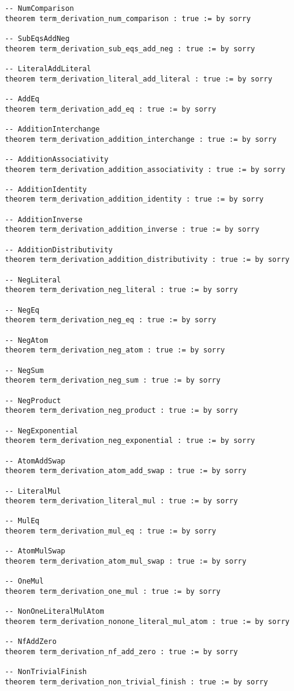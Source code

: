 \documentclass{article}
\begin{document}
\begin{tcolorbox}[colback=white!10, width=\linewidth]
\begin{lstlisting}[language=Lean4]
-- NumComparison
theorem term_derivation_num_comparison : true := by sorry

-- SubEqsAddNeg
theorem term_derivation_sub_eqs_add_neg : true := by sorry

-- LiteralAddLiteral
theorem term_derivation_literal_add_literal : true := by sorry

-- AddEq
theorem term_derivation_add_eq : true := by sorry

-- AdditionInterchange
theorem term_derivation_addition_interchange : true := by sorry

-- AdditionAssociativity
theorem term_derivation_addition_associativity : true := by sorry

-- AdditionIdentity
theorem term_derivation_addition_identity : true := by sorry

-- AdditionInverse
theorem term_derivation_addition_inverse : true := by sorry

-- AdditionDistributivity
theorem term_derivation_addition_distributivity : true := by sorry

-- NegLiteral
theorem term_derivation_neg_literal : true := by sorry

-- NegEq
theorem term_derivation_neg_eq : true := by sorry

-- NegAtom
theorem term_derivation_neg_atom : true := by sorry

-- NegSum
theorem term_derivation_neg_sum : true := by sorry

-- NegProduct
theorem term_derivation_neg_product : true := by sorry

-- NegExponential
theorem term_derivation_neg_exponential : true := by sorry

-- AtomAddSwap
theorem term_derivation_atom_add_swap : true := by sorry

-- LiteralMul
theorem term_derivation_literal_mul : true := by sorry

-- MulEq
theorem term_derivation_mul_eq : true := by sorry

-- AtomMulSwap
theorem term_derivation_atom_mul_swap : true := by sorry

-- OneMul
theorem term_derivation_one_mul : true := by sorry

-- NonOneLiteralMulAtom
theorem term_derivation_nonone_literal_mul_atom : true := by sorry

-- NfAddZero
theorem term_derivation_nf_add_zero : true := by sorry

-- NonTrivialFinish
theorem term_derivation_non_trivial_finish : true := by sorry


\end{lstlisting}
\end{tcolorbox}
\end{document}
